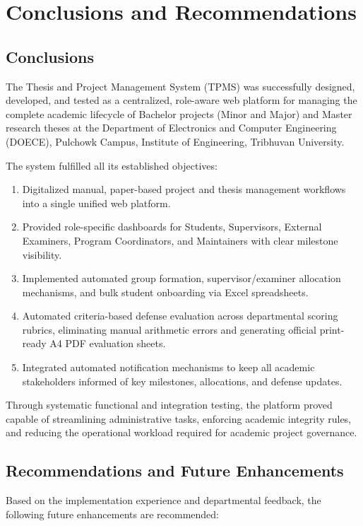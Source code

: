 \chapter{Conclusions and Recommendations}

\section{Conclusions}
The Thesis and Project Management System (TPMS) was successfully designed, developed, and tested as a centralized, role-aware web platform for managing the complete academic lifecycle of Bachelor projects (Minor and Major) and Master research theses at the Department of Electronics and Computer Engineering (DOECE), Pulchowk Campus, Institute of Engineering, Tribhuvan University.

The system fulfilled all its established objectives:
\begin{enumerate}
  \item Digitalized manual, paper-based project and thesis management workflows into a single unified web platform.
  \item Provided role-specific dashboards for Students, Supervisors, External Examiners, Program Coordinators, and Maintainers with clear milestone visibility.
  \item Implemented automated group formation, supervisor/examiner allocation mechanisms, and bulk student onboarding via Excel spreadsheets.
  \item Automated criteria-based defense evaluation across departmental scoring rubrics, eliminating manual arithmetic errors and generating official print-ready A4 PDF evaluation sheets.
  \item Integrated automated notification mechanisms to keep all academic stakeholders informed of key milestones, allocations, and defense updates.
\end{enumerate}

Through systematic functional and integration testing, the platform proved capable of streamlining administrative tasks, enforcing academic integrity rules, and reducing the operational workload required for academic project governance.

\section{Recommendations and Future Enhancements}
Based on the implementation experience and departmental feedback, the following future enhancements are recommended:

